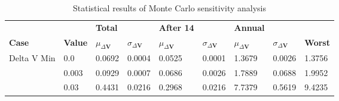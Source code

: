 \begin{table}[H]
\centering
\begin{tabular}{lllllllll}
 &  & \cellcolor[HTML]{EFEFEF}\textbf{Total} &  & \cellcolor[HTML]{EFEFEF}\textbf{After 14} & & \cellcolor[HTML]{EFEFEF}\textbf{Annual} & &\\
\rowcolor[HTML]{EFEFEF} 
\textbf{Case} & \textbf{Value} & \textbf{$\mu_{\Delta \boldsymbol{V}}$} & \textbf{$\sigma_{\Delta \boldsymbol{V}}$} & \textbf{$\mu_{\Delta \boldsymbol{V}}$} & \textbf{$\sigma_{\Delta \boldsymbol{V}}$} & \textbf{$\mu_{\Delta \boldsymbol{V}}$} & \textbf{$\sigma_{\Delta \boldsymbol{V}}$} & \textbf{Worst} \\ 
Delta V Min & 0.0 & 0.0692 & 0.0004 & 0.0525 & 0.0001 & 1.3679 & 0.0026 & 1.3756 \\ 
 & 0.003 & 0.0929 & 0.0007 & 0.0686 & 0.0026 & 1.7889 & 0.0688 & 1.9952 \\ 
 & 0.03 & 0.4431 & 0.0216 & 0.2968 & 0.0216 & 7.7379 & 0.5619 & 9.4235 \\ 
\end{tabular}
\caption{Statistical results of Monte Carlo sensitivity analysis}
\label{tab:SensitivityAnalysis}
\end{table}